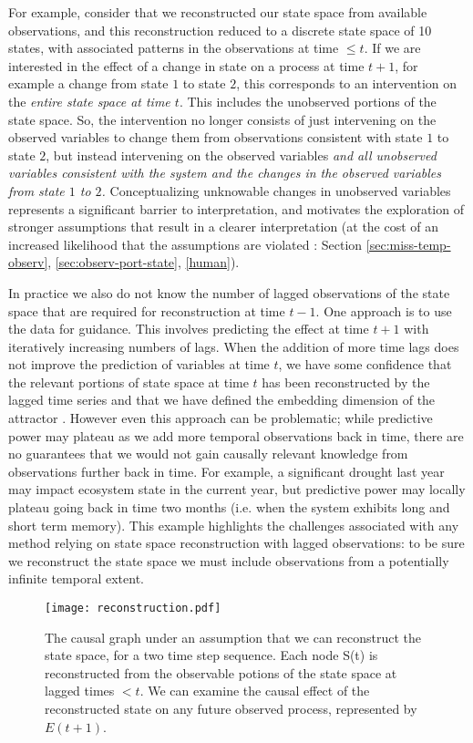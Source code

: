 \documentclass[12pt]{article}
\begin{document}
For example, consider that we reconstructed our state space from
available observations, and this reconstruction reduced to a discrete
state space of 10 states, with associated patterns in the observations
at time $\leq t$. If we are interested in the effect of a change in
state on a process at time $t+1$, for example a change from state $1$
to state $2$, this corresponds to an intervention on the
\textit{entire state space at time $t$}. This includes the unobserved
portions of the state space. So, the intervention no longer consists
of just intervening on the observed variables to change them from
observations consistent with state $1$ to state $2$, but instead
intervening on the observed variables \emph{and all unobserved
  variables consistent with the system and the changes in the observed
  variables from state $1$ to $2$.}  Conceptualizing unknowable
changes in unobserved variables represents a significant barrier to
interpretation, and motivates the exploration of stronger assumptions
that result in a clearer interpretation (at the cost of an increased
likelihood that the assumptions are violated : Section
\ref{sec:miss-temp-observ}, \ref{sec:observ-port-state}, \ref{human}).

In practice we also do not know the number of lagged observations of
the state space that are required for reconstruction at time
$t-1$. One approach is to use the data for guidance. This involves
predicting the effect at time $t+1$ with iteratively increasing
numbers of lags. When the addition of more time lags does not improve
the prediction of variables at time $t$, we have some confidence that
the relevant portions of state space at time $t$ has been
reconstructed by the lagged time series and that we have defined the
embedding dimension of the attractor . However even this approach can be
problematic; while predictive power may plateau as we add more
temporal observations back in time, there are no guarantees that we
would not gain causally relevant knowledge from observations further
back in time. For example, a significant drought last year may impact
ecosystem state in the current year, but predictive power may locally
plateau going back in time two months (i.e. when the system exhibits
long and short term memory). This example highlights the
challenges associated with any method relying on state space
reconstruction with lagged observations: to be sure we reconstruct the
state space we must include observations from a potentially infinite
temporal extent.

\begin{figure}
  \texttt{[image: reconstruction.pdf]}
  \caption{The causal graph under an assumption that we can
    reconstruct the state space, for a two time step sequence. Each
    node S(t) is reconstructed from the observable potions of the
    state space at lagged times $< t$. We can examine the causal
    effect of the reconstructed state on any future observed process,
    represented by $E(t+1)$.}
  \label{fig:reconstructed}
\end{figure}
\end{document}
